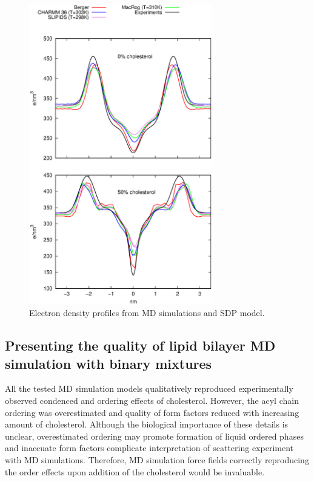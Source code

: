 \documentclass[aps,prl,superscriptaddress,twocolumn]{revtex4}
\begin{document}
\begin{figure}[]
  \centering
  \includegraphics[width=8cm]{../FIGS/densitiesEXTREMES.eps}
  \caption{\label{densities}
    Electron density profiles from MD simulations and SDP model.
  }
\end{figure}


\subsection{Presenting the quality of lipid bilayer MD simulation with binary mixtures}  

All the tested MD simulation models qualitatively reproduced experimentally observed condenced and
ordering effects of cholesterol. However, the acyl chain ordering was overestimated and quality
of form factors reduced with increasing amount of cholesterol. Although the biological importance
of these details is unclear, overestimated ordering may promote formation of liquid ordered phases and
inaccuate form factors complicate interpretation of scattering experiment with MD simulations.
Therefore, MD simulation force fields correctly reproducing the order effects upon addition of the
cholesterol would be invaluable.
\end{document}
